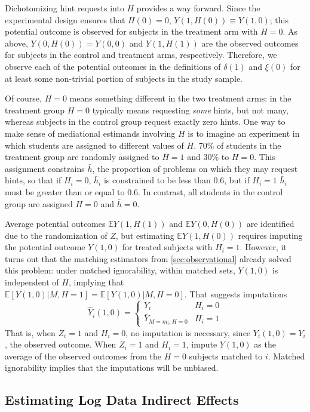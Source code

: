 \documentclass{article}\usepackage[]{graphicx}\usepackage[]{color}
\newcommand{\EE}{\mathbb{E}}
\begin{document}
Dichotomizing hint requests into $H$ provides a
way forward.
Since the experimental design ensures that $H(0)=0$, $Y(1,H(0))\equiv
Y(1,0)$; this potential outcome is observed for subjects in
the treatment arm with $H=0$.
As above, $Y(0,H(0))=Y(0,0)$ and $Y(1,H(1))$ are the observed outcomes
for subjects in the control and treatment arms, respectively.
Therefore, we observe each of the potential outcomes in the definitions of
$\delta(1)$ and $\xi(0)$ for at least some non-trivial
portion of subjects in the study sample.

Of course, $H=0$ means something different in the two treatment arms:
in the treatment group $H=0$ typically means requesting
\emph{some} hints, but not many, whereas subjects in the control group
request exactly zero hints.
One way to make sense of mediational estimands involving $H$ is to
imagine an experiment in which students are assigned to different
values of $H$.
70\% of students in the treatment group
are randomly assigned to $H=1$ and 30\% to
$H=0$.
This assignment constrains $\bar{h}$, the proportion of problems on which they
may request hints, so that if $H_i=0$,
$\bar{h}_i$ is constrained to be less than
0.6,
but if $H_i=1$ $\bar{h}_i$ must be greater than or equal to
0.6.
In contrast, all students in the control group are assigned $H=0$ and $\bar{h}=0$.

Average potential outcomes $\EE Y(1,H(1))$ and $\EE Y(0,H(0))$ are
identified due to the randomization of $Z$, but estimating $\EE
Y(1,H(0))$ requires imputing the
potential outcome $Y(1,0)$ for treated subjects with $H_i=1$.
However, it turns out that the matching estimators from
\ref{sec:observational} already solved this problem:
under matched ignorability, within matched sets, $Y(1,0)$
is independent of $H$, implying that $\EE[Y(1,0)|M,H=1]=\EE[Y(1,0)|M,H=0]$.
That suggests imputations
\begin{equation}\label{eq:estY10}
\hat{Y}_i(1,0)=\begin{cases}
 Y_i & H_i=0\\
\bar{Y}_{M=m_i,H=0} & H_i=1
\end{cases}
\end{equation}
That is, when $Z_i=1$ and $H_i=0$, no imputation is necessary, since
$Y_i(1,0)=Y_i$, the observed outcome. When $Z_i=1$ and $H_i=1$,
impute $Y(1,0)$ as the average of the observed outcomes from the $H=0$ subjects
matched to $i$.
Matched ignorability implies that the imputations will be unbiased.

\subsection{Estimating Log Data Indirect Effects}\label{sec:indirectEst}
\end{document}
